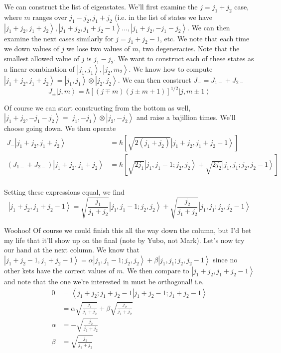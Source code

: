 \documentclass[10pt]{report}
\newcommand{\ket}[1]{\left|#1\right>}
\newcommand{\dotp}[2]{\left<#1\left.\right|#2\right>}
\begin{document}
We can construct the list of eigenstates. We'll first examine the $j = j_1 + j_2$ case, where $m$ ranges over $j_1 - j_2, j_1 + j_2$ (i.e. in the list of states we have $\ket{j_1 + j_2, j_1 + j_2}, \ket{j_1+j_2, j_1+j_2-1}\dots, \ket{j_1 + j_2, -j_1 - j_2}$. We can then examine the next cases similarly for $j = j_1 + j_2 - 1$, etc. We note that each time we down values of $j$ we lose two values of $m$, two degeneracies. Note that the smallest allowed value of $j$ is $j_1 - j_2$.  We want to construct each of these states as a linear combination of $\ket{j_1, j_1}, \ket{j_2, m_2}$. We know how to compute $\ket{j_1 + j_2, j_1 + j_2} = \ket{j_1, j_1}\otimes \ket{j_2, j_2}$. We can then construct $J_- = J_{1-} + J_{2-}$
$$J_{\pm}\ket{j,m} = \hbar\left[ (j\mp m)(j\pm m+1) \right]^{1/2}\ket{j, m\pm 1}$$

Of course we can start constructing from the bottom as well, $\ket{j_1 + j_2, -j_1 - j_2} = \ket{j_1, -j_1}\otimes \ket{j_2, -j_2}$ and raise a bajillion times. We'll choose going down. We then operate
\begin{align*}
    J_-\ket{j_1 + j_2, j_1 + j_2} &= \hbar\left[ \sqrt{2(j_1 + j_2)} \ket{j_1 + j_2, j_1 + j_2 -1} \right]\\
    (J_{1-} + J_{2-})\ket{j_1 + j_2, j_1 + j_2} &= \hbar \left[ \sqrt{2j_1}\ket{j_1, j_1-1; j_2, j_2} + \sqrt{2j_2}\ket{j_1, j_1; j_2, j_2-1} \right]\\
\end{align*}

Setting these expressions equal, we find
$$\ket{j_1 + j_2, j_1 + j_2 - 1} = \sqrt{\frac{j_1}{j_1 + j_2}}\ket{j_1, j_1-1; j_2, j_2} + \sqrt{\frac{j_2}{j_1 + j_2}}\ket{j_1, j_1; j_2, j_2-1}$$

Woohoo! Of course we could finish this all the way down the column, but I'd bet my life that it'll show up on the final (note by Yubo, not Mark). Let's now try our hand at the next column. We know that $\ket{j_1 + j_2 - 1, j_1 + j_2 - 1} = \alpha \ket{j_1, j_1 -1; j_2, j_2} + \beta \ket{j_1, j_1; j_2, j_2-1}$ since no other kets have the correct values of $m$. We then compare to $\ket{j_1 + j_2, j_1 + j_2 -1}$ and note that the one we're interested in must be orthogonal! i.e. 
\begin{align*}
    0 &= \dotp{j_1 + j_2; j_1 + j_2 - 1}{j_1 + j_2 - 1; j_1 + j_2 - 1}\\
    &= \alpha\sqrt{\frac{j_1}{j_1 + j_2}} + \beta\sqrt{\frac{j_2}{j_1 + j_2}}\\
    \alpha &= -\sqrt{\frac{j_2}{j_1 + j_2}}\\
    \beta &= \sqrt{\frac{j_1}{j_1 + j_2}}
\end{align*}
\end{document}

